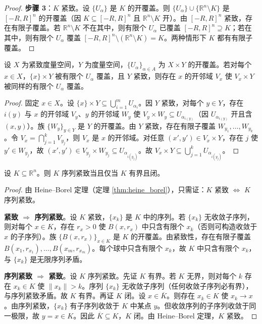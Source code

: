 \begin{proof}
\textbf{步骤 3}：$K$ 紧致。设 $\{U_\alpha\}$ 是 $K$ 的开覆盖。则 $\{U_\alpha\} \cup \{\mathbb{R}^n \setminus K\}$ 是 $[-R, R]^n$ 的开覆盖（因 $K \subseteq [-R, R]^n$ 且 $\mathbb{R}^n \setminus K$ 开）。由 $[-R, R]^n$ 紧致，存在有限子覆盖。若 $\mathbb{R}^n \setminus K$ 不在其中，则有限个 $U_\alpha$ 已覆盖 $[-R, R]^n \supseteq K$；若在其中，则有限个 $U_\alpha$ 覆盖 $[-R, R]^n \setminus (\mathbb{R}^n \setminus K) = K$。两种情形下 $K$ 都有有限子覆盖。
\end{proof}

\begin{lemma}[管状邻域引理]\label{lem:tube_neighbourhood}
设 $X$ 为紧致度量空间，$Y$ 为度量空间，$\{U_\alpha\}_{\alpha \in A}$ 为 $X \times Y$ 的开覆盖。若对每个 $x \in X$，$\{x\} \times Y$ 被有限个 $U_\alpha$ 覆盖，且 $Y$ 紧致，则存在 $x$ 的开邻域 $V_x$ 使 $V_x \times Y$ 被同样的有限个 $U_\alpha$ 覆盖。
\end{lemma}

\begin{proof}
固定 $x \in X$。设 $\{x\} \times Y \subseteq \bigcup_{i=1}^{m} U_{\alpha_i}$。因 $Y$ 紧致，对每个 $y \in Y$，存在 $i(y)$ 与 $x$ 的开邻域 $V_y$、$y$ 的开邻域 $W_y$ 使 $V_y \times W_y \subseteq U_{\alpha_{i(y)}}$（因 $U_{\alpha_{i(y)}}$ 开且含 $(x, y)$）。族 $\{W_y\}_{y \in Y}$ 是 $Y$ 的开覆盖。由 $Y$ 紧致，存在有限子覆盖 $W_{y_1}, \dots, W_{y_k}$。令 $V_x = \bigcap_{j=1}^{k} V_{y_j}$，则 $V_x$ 是 $x$ 的开邻域。对任意 $(x', y') \in V_x \times Y$，存在 $j$ 使 $y' \in W_{y_j}$，故 $(x', y') \in V_{y_j} \times W_{y_j} \subseteq U_{\alpha_{i(y_j)}}$。故 $V_x \times Y \subseteq \bigcup_{j=1}^{k} U_{\alpha_{i(y_j)}}$。
\end{proof}

\begin{theorem}\label{thm:bolzano_weierstrass}
设 $K \subseteq \mathbb{R}^n$。则 $K$ 序列紧致当且仅当 $K$ 有界且闭。
\end{theorem}

\begin{proof}
由 Heine--Borel 定理（定理 \ref{thm:heine_borel}），只需证：$K$ 紧致 $\iff$ $K$ 序列紧致。

\textbf{紧致 $\Rightarrow$ 序列紧致}。设 $K$ 紧致，$\{x_k\}$ 是 $K$ 中的序列。若 $\{x_k\}$ 无收敛子序列，则对每个 $x \in K$，存在 $r_x > 0$ 使 $B(x, r_x)$ 中只含有限个 $x_k$（否则可构造收敛于 $x$ 的子序列）。族 $\{B(x, r_x)\}_{x \in K}$ 是 $K$ 的开覆盖。由紧致性，存在有限子覆盖 $B(x_1, r_{x_1}), \dots, B(x_m, r_{x_m})$。每个球中只含有限个 $x_k$，故 $K$ 中只含有限个 $x_k$，与 $\{x_k\}$ 是无限序列矛盾。

\textbf{序列紧致 $\Rightarrow$ 紧致}。设 $K$ 序列紧致。先证 $K$ 有界。若 $K$ 无界，则对每个 $k$ 存在 $x_k \in K$ 使 $\|x_k\| > k$。序列 $\{x_k\}$ 无收敛子序列（任何收敛子序列必有界），与序列紧致矛盾。故 $K$ 有界。再证 $K$ 闭。设 $x \in \overline{K}$。则存在 $x_k \in K$ 使 $x_k \to x$。由序列紧致，$\{x_k\}$ 有子序列收敛于 $K$ 中某点 $y$。但收敛序列的子序列收敛于同一极限，故 $y = x \in K$。因此 $\overline{K} \subseteq K$，$K$ 闭。由 Heine--Borel 定理，$K$ 紧致。
\end{proof}


